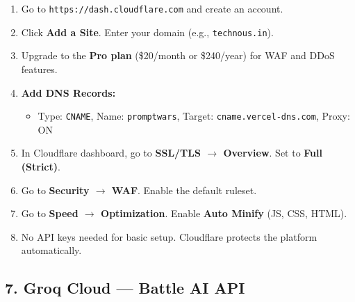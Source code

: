 \documentclass[11pt, a4paper]{article}
\begin{document}
\begin{tcolorbox}[stepbox, title={Step-by-Step: Cloudflare Setup}]
\begin{enumerate}[leftmargin=1cm, itemsep=3pt]
    \item Go to \texttt{https://dash.cloudflare.com} and create an account.
    \item Click \textbf{Add a Site}. Enter your domain (e.g., \texttt{technous.in}).
    \item Upgrade to the \textbf{Pro plan} (\$20/month or \$240/year) for WAF and DDoS features.
    \item \textbf{Add DNS Records:}
        \begin{itemize}[leftmargin=0.8cm]
            \item Type: \texttt{CNAME}, Name: \texttt{promptwars}, Target: \texttt{cname.vercel-dns.com}, Proxy: ON
        \end{itemize}
    \item In Cloudflare dashboard, go to \textbf{SSL/TLS $\to$ Overview}. Set to \textbf{Full (Strict)}.
    \item Go to \textbf{Security $\to$ WAF}. Enable the default ruleset.
    \item Go to \textbf{Speed $\to$ Optimization}. Enable \textbf{Auto Minify} (JS, CSS, HTML).
    \item No API keys needed for basic setup. Cloudflare protects the platform automatically.
\end{enumerate}
\end{tcolorbox}

\subsection{7. Groq Cloud --- Battle AI API}
\end{document}
